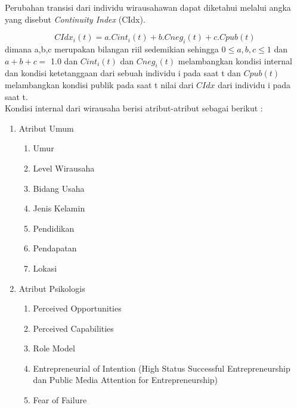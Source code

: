 Perubahan transisi dari individu wirausahawan dapat diketahui melalui angka yang disebut \textit{Continuity Index} (CIdx).

\begin{displaymath}
\label{RumusCIDx}
	CIdx_{i}(t) = a.Cint_{i}(t) + b.Cneg_{i}(t) + c.Cpub(t)
\end{displaymath}
dimana a,b,c merupakan bilangan riil sedemikian sehingga $0\leq a,b,c \leq 1$ dan $a+b+c=$ 1.0 dan $Cint_{i}(t)$ dan $Cneg_{i}(t)$ melambangkan kondisi internal dan kondisi ketetanggaan dari sebuah individu i pada saat t dan $Cpub(t)$ melambangkan kondisi publik pada saat t nilai dari $CIdx$ dari individu i pada saat t.\\
Kondisi internal dari wirausaha berisi atribut-atribut sebagai berikut :\\
\begin{enumerate}
	\item Atribut Umum
		\begin{enumerate}
			\item Umur
			\item Level Wirausaha
			\item Bidang Usaha
			\item Jenis Kelamin
			\item Pendidikan
			\item Pendapatan
			\item Lokasi
		\end{enumerate}
	\item Atribut Psikologis
		 \begin{enumerate}
			\item Perceived Opportunities
			\item Perceived Capabilities
			\item Role Model
			\item Entrepreneurial of Intention (High Status Successful Entrepreneurship dan Public Media Attention for Entrepreneurship)
			\item Fear of Failure
		 \end{enumerate}
		\end{enumerate}
		
